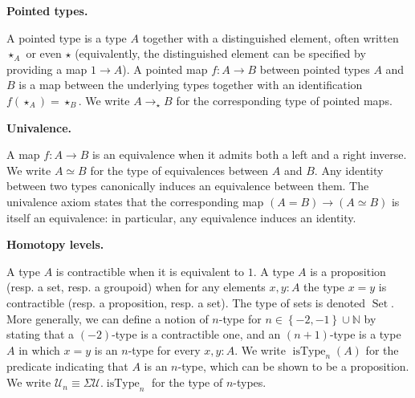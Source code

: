  
 
 
\par\medskip\noindent\textbf{Pointed types.}\par
 
 
A pointed type is a type $A$ together with a distinguished element, often written $\star_{A}$ or even $\star$ (equivalently, the distinguished element can be specified by providing a map $1\to A$). A pointed map $f:A\to B$ between pointed types $A$ and $B$ is a map between the underlying types together with an identification $f(\star_{A})=\star_{B}$. We write $A\to_{\star{}}B$ for the corresponding type of pointed maps.\par
 
 
 
 
\par\medskip\noindent\textbf{Univalence.}\par
 
 
A map $f:A\to B$ is an equivalence when it admits both a left and a right inverse. We write $A\simeq B$ for the type of equivalences between $A$ and $B$. Any identity between two types canonically induces an equivalence between them. The univalence axiom states that the corresponding map $(A=B)\to(A\simeq B)$ is itself an equivalence: in particular, any equivalence induces an identity.\par
 
 
 
 
\par\medskip\noindent\textbf{Homotopy levels.}\par
 
 
A type $A$ is contractible when it is equivalent to $1$. A type $A$ is a proposition (resp. a set, resp. a groupoid) when for any elements $x,y:A$ the type $x=y$ is contractible (resp. a proposition, resp. a set). The type of sets is denoted $\operatorname{Set}$. More generally, we can define a notion of $n$-type for $n\in\left\{-2,-1\right\}\cup\mathbb{N}$ by stating that a $(-2)$-type is a contractible one, and an $(n{+}1)$-type is a type $A$ in which $x=y$ is an $n$-type for every $x,y:A$. We write $\operatorname{isType}_{n}(A)$ for the predicate indicating that $A$ is an $n$-type, which can be shown to be a proposition. We write $\mathcal{U}_{n}\equiv\Sigma\mathcal{U}.\operatorname{isType}_{n}$ for the type of $n$-types.\par
 
